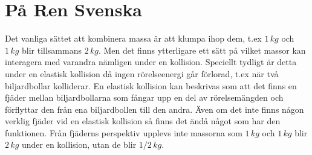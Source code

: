 \documentclass[]{elementary-physics}
\begin{document}
\section{På Ren Svenska}

Det vanliga sättet att kombinera massa är att klumpa ihop dem, t.ex $1 \, kg$ och $1 \, kg$ blir tillsammans $2 \, kg$.
Men det finns ytterligare ett sätt på vilket massor kan interagera med varandra nämligen under en kollision.
Speciellt tydligt är detta under en elastisk kollision då ingen rörelseenergi går förlorad, t.ex när två biljardbollar kolliderar.
En elastisk kollision kan beskrivas som att det finns en fjäder mellan biljardbollarna som fångar upp en del av rörelsemängden och förflyttar den från ena biljardbollen till den andra.
Även om det inte finns någon verklig fjäder vid en elastisk kollision så finns det ändå något som har den funktionen.
Från fjäderns perspektiv upplevs inte massorna som $1 \, kg$ och $1 \, kg$ blir $2 \, kg$ under en kollision, utan de blir $1/2 \, kg$.



\printbibliography
\end{document}

